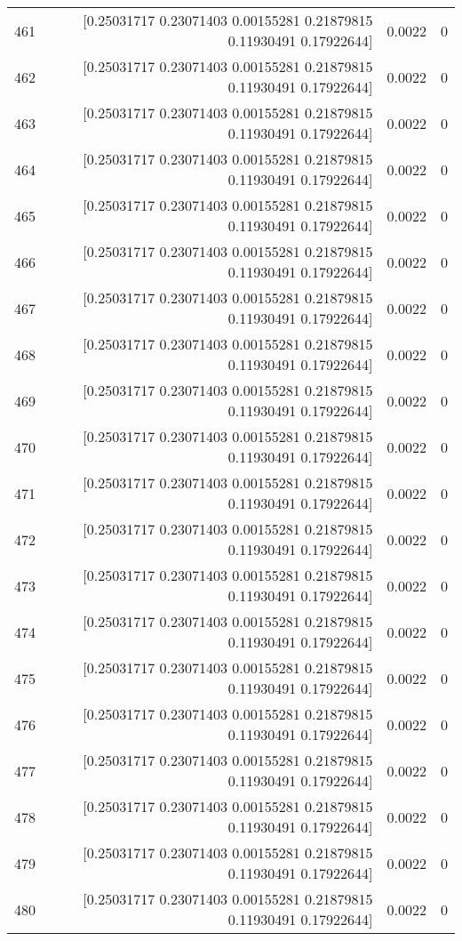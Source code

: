 \begin{longtable}{lrrr}
461 & [0.25031717 0.23071403 0.00155281 0.21879815 0.11930491 0.17922644] & 0.0022 & 0 \\
462 & [0.25031717 0.23071403 0.00155281 0.21879815 0.11930491 0.17922644] & 0.0022 & 0 \\
463 & [0.25031717 0.23071403 0.00155281 0.21879815 0.11930491 0.17922644] & 0.0022 & 0 \\
464 & [0.25031717 0.23071403 0.00155281 0.21879815 0.11930491 0.17922644] & 0.0022 & 0 \\
465 & [0.25031717 0.23071403 0.00155281 0.21879815 0.11930491 0.17922644] & 0.0022 & 0 \\
466 & [0.25031717 0.23071403 0.00155281 0.21879815 0.11930491 0.17922644] & 0.0022 & 0 \\
467 & [0.25031717 0.23071403 0.00155281 0.21879815 0.11930491 0.17922644] & 0.0022 & 0 \\
468 & [0.25031717 0.23071403 0.00155281 0.21879815 0.11930491 0.17922644] & 0.0022 & 0 \\
469 & [0.25031717 0.23071403 0.00155281 0.21879815 0.11930491 0.17922644] & 0.0022 & 0 \\
470 & [0.25031717 0.23071403 0.00155281 0.21879815 0.11930491 0.17922644] & 0.0022 & 0 \\
471 & [0.25031717 0.23071403 0.00155281 0.21879815 0.11930491 0.17922644] & 0.0022 & 0 \\
472 & [0.25031717 0.23071403 0.00155281 0.21879815 0.11930491 0.17922644] & 0.0022 & 0 \\
473 & [0.25031717 0.23071403 0.00155281 0.21879815 0.11930491 0.17922644] & 0.0022 & 0 \\
474 & [0.25031717 0.23071403 0.00155281 0.21879815 0.11930491 0.17922644] & 0.0022 & 0 \\
475 & [0.25031717 0.23071403 0.00155281 0.21879815 0.11930491 0.17922644] & 0.0022 & 0 \\
476 & [0.25031717 0.23071403 0.00155281 0.21879815 0.11930491 0.17922644] & 0.0022 & 0 \\
477 & [0.25031717 0.23071403 0.00155281 0.21879815 0.11930491 0.17922644] & 0.0022 & 0 \\
478 & [0.25031717 0.23071403 0.00155281 0.21879815 0.11930491 0.17922644] & 0.0022 & 0 \\
479 & [0.25031717 0.23071403 0.00155281 0.21879815 0.11930491 0.17922644] & 0.0022 & 0 \\
480 & [0.25031717 0.23071403 0.00155281 0.21879815 0.11930491 0.17922644] & 0.0022 & 0 \\

\end{longtable}
